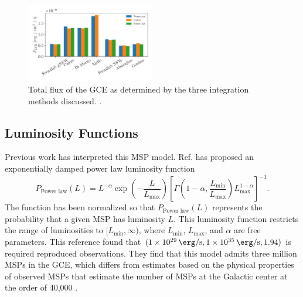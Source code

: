 \documentclass[a4paper,11pt]{article}
\newcommand{\parens}[1]{\left(#1\right)}
\newcommand{\brackets}[1]{\left[#1\right]}
\newcommand{\expp}[1]{\exp \parens{#1}}
\newcommand{\comment}[1]{\emph{\color{red}{#1}}}
\begin{document}
\comment{Discuss how rescaling of the ROI was done}

\begin{figure}
    \centering
    \includegraphics[width=0.5\textwidth]{figs/total-flux-bars.pdf}
    \caption{Total flux of the GCE as determined by the three integration methods discussed. \comment{Here I would discuss why Ajello doesn't have a value for the power law case if this is still true once I have the original source}.}
    \label{fig:total-flux-bars}
\end{figure}


\comment{Just double check that I normalized the power law correctly in parse\_spectrum.py.}

\subsection{Luminosity Functions}
\label{sec:lum-funcs}
Previous work has interpreted this MSP model. Ref. \cite{Zhong:2019ycb} has proposed an exponentially damped power law luminosity function
\begin{equation}
    P_\text{Power law}(L) = L^{-\alpha} \expp{-\frac{L}{L_\text{max}}}\brackets{\Gamma\parens{1-\alpha, \frac{L_\text{min}}{L_\text{max}}}L_\text{max}^{1-\alpha}}^{-1}.
    \label{eqn:power-law}
\end{equation}
The function has been normalized so that $P_\text{Power law}(L)$ represents the probability that a given MSP has luminosity $L$. This luminosity function restricts the range of luminosities to $[L_\text{min}, \infty)$, where $L_\text{min}$, $L_\text{max}$, and $\alpha$ are free parameters. \comment{The following should probably be moved to the introduction, where Fermilab's research is described.} This reference found that $(\SI{1e29}{\erg\per\second}, \SI{1e35}{\erg\per\second}, 1.94)$ is required reproduced observations. They find that this model admits three million MSPs in the GCE, which differs from estimates based on the physical properties of observed MSPs that estimate the number of MSPs at the Galactic center at the order of 40,000 \cite{citation_needed}.
\end{document}

